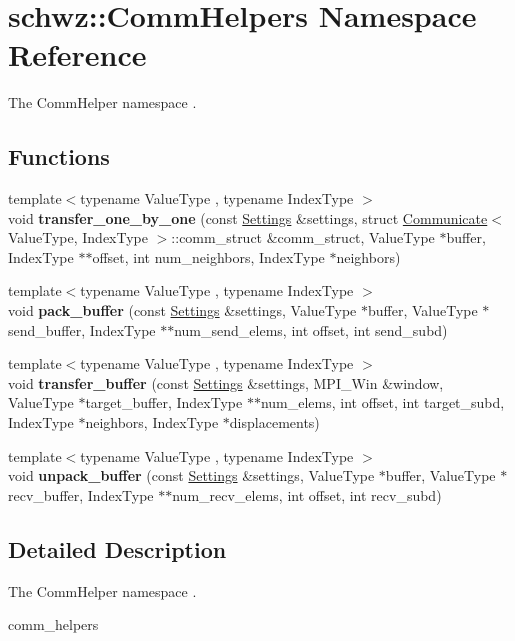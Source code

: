 \hypertarget{namespaceschwz_1_1CommHelpers}{}\section{schwz\+:\+:Comm\+Helpers Namespace Reference}
\label{namespaceschwz_1_1CommHelpers}


The Comm\+Helper namespace .  


\subsection*{Functions}
\begin{DoxyCompactItemize}
\item 
\mbox{\label{namespaceschwz_1_1CommHelpers_a649cff721443b605791abc1127af8796}} 
{\footnotesize template$<$typename Value\+Type , typename Index\+Type $>$ }\\void {\bfseries transfer\+\_\+one\+\_\+by\+\_\+one} (const \hyperlink{structschwz_1_1Settings}{Settings} \&settings, struct \hyperlink{classschwz_1_1Communicate}{Communicate}$<$ Value\+Type, Index\+Type $>$\+::comm\+\_\+struct \&comm\+\_\+struct, Value\+Type $\ast$buffer, Index\+Type $\ast$$\ast$offset, int num\+\_\+neighbors, Index\+Type $\ast$neighbors)
\item 
\mbox{\label{namespaceschwz_1_1CommHelpers_af8b226ff485829069e8769eea1a9c1e7}} 
{\footnotesize template$<$typename Value\+Type , typename Index\+Type $>$ }\\void {\bfseries pack\+\_\+buffer} (const \hyperlink{structschwz_1_1Settings}{Settings} \&settings, Value\+Type $\ast$buffer, Value\+Type $\ast$send\+\_\+buffer, Index\+Type $\ast$$\ast$num\+\_\+send\+\_\+elems, int offset, int send\+\_\+subd)
\item 
\mbox{\label{namespaceschwz_1_1CommHelpers_a05d10520ce2980f012ca6e89916801b4}} 
{\footnotesize template$<$typename Value\+Type , typename Index\+Type $>$ }\\void {\bfseries transfer\+\_\+buffer} (const \hyperlink{structschwz_1_1Settings}{Settings} \&settings, M\+P\+I\+\_\+\+Win \&window, Value\+Type $\ast$target\+\_\+buffer, Index\+Type $\ast$$\ast$num\+\_\+elems, int offset, int target\+\_\+subd, Index\+Type $\ast$neighbors, Index\+Type $\ast$displacements)
\item 
\mbox{\label{namespaceschwz_1_1CommHelpers_aaa7aa05475e265f8d22c234a50637626}} 
{\footnotesize template$<$typename Value\+Type , typename Index\+Type $>$ }\\void {\bfseries unpack\+\_\+buffer} (const \hyperlink{structschwz_1_1Settings}{Settings} \&settings, Value\+Type $\ast$buffer, Value\+Type $\ast$recv\+\_\+buffer, Index\+Type $\ast$$\ast$num\+\_\+recv\+\_\+elems, int offset, int recv\+\_\+subd)
\end{DoxyCompactItemize}


\subsection{Detailed Description}
The Comm\+Helper namespace . 

comm\+\_\+helpers 